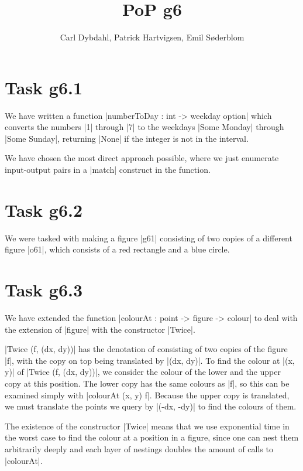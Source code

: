 \documentclass[a4paper]{article}
\title{PoP g6}
\author{Carl Dybdahl, Patrick Hartvigsen, Emil Søderblom}
\begin{document}
\maketitle

\section{Task g6.1}

We have written a function \code|numberToDay : int -> weekday option| which converts the numbers \code|1| through \code|7| to the weekdays \code|Some Monday| through \code|Some Sunday|, returning \code|None| if the integer is not in the interval.


\noindent We have chosen the most direct approach possible, where we just enumerate input-output pairs in a \code|match| construct in the function.

\section{Task g6.2}

We were tasked with making a figure \code|g61| consisting of two copies of a different figure \code|o61|, which consists of a red rectangle and a blue circle.


\section{Task g6.3}

We have extended the function \code|colourAt : point -> figure -> colour| to deal with the extension of \code|figure| with the constructor \code|Twice|.


\noindent \code|Twice (f, (dx, dy))| has the denotation of consisting of two copies of the figure \code|f|, with the copy on top being translated by \code|(dx, dy)|. To find the colour at \code|(x, y)| of \code|Twice (f, (dx, dy))|, we consider the colour of the lower and the upper copy at this position. The lower copy has the same colours as \code|f|, so this can be examined simply with \code|colourAt (x, y) f|. Because the upper copy is translated, we must translate the points we query by \code|(-dx, -dy)| to find the colours of them.

The existence of the constructor \code|Twice| means that we use exponential time in the worst case to find the colour at a position in a figure, since one can nest them arbitrarily deeply and each layer of nestings doubles the amount of calls to \code|colourAt|.
\end{document}
